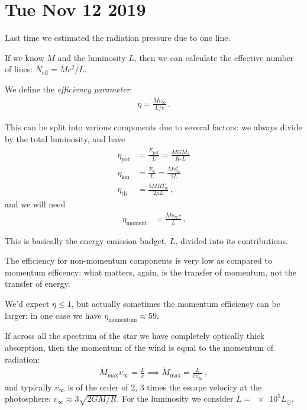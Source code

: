 \documentclass[main.tex]{subfiles}
\begin{document}
\section*{Tue Nov 12 2019}

Last time we estimated the radiation pressure due to one line.

If we know \(\dot{M} \) and the luminosity \(L\), then we can calculate the effective number of  lines: \(N _{\text{eff}} = \dot{M} c^2 / L\).

We define the \emph{efficiency parameter}: 
%
\begin{align}
  \eta = \frac{\dot{M} v_{\infty}}{L / c}
\,.
\end{align}

This can be split into various components due to several factors: we always divide by the total luminosity, and have 
%
\begin{subequations}
\begin{align}
  \eta _{\text{pot}} &= \frac{\dot{E}_{\text{pot}}}{L}  = \frac{\dot{M} G M_{*}}{R_{*}L}  \\
  \eta _{\text{kin}} &= \frac{\dot{E}_k}{L} = \frac{\dot{M} v_{\infty}^2}{2L}  \\
  \eta _{\text{th}} &= \frac{5 \dot{M} R T_w}{2 \mu L} 
  \,,
\end{align}
\end{subequations}
%
and we will need 
%
\begin{align}
    \eta _{\text{moment}} &= \frac{\dot{M} v_{\infty} c}{L}
\,.
\end{align}

This is basically the energy emission budget, \(L\), divided into its contributions.

The efficiency for non-momentum components is very low as compared to momentum efficency: what matters, again, is the transfer of momentum, not the transfer of energy.

We'd expect \(\eta \leq 1\), but actually sometimes the momentum efficiency can be larger: in one case we have \(\eta _{\text{momentum}} \approx 59\).

If across all the spectrum of the star we have completely optically thick absorption, then the momentum of the wind is equal to the momentum of radiation: 
%
\begin{align} \label{eq:completely-optically-thick}
  \dot{M} _{\text{max}} v_{\infty} = \frac{L}{c} 
  \implies \dot{M} _{\text{max}} = \frac{L}{c v_{\infty}}
\,,
\end{align}
%
and typically \(v_{\infty}\) is of the order of 2, 3 times the escape velocity at the photosphere: \(v_{\infty} \approx 3 \sqrt{2 GM / R}\).
For the luminosity we consider \(L = \num{e5} L_{\odot}\).
\end{document}
